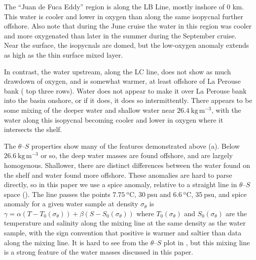 \documentclass[draft]{agujournal2019}
\begin{document}
The ``Juan de Fuca Eddy'' region is along the LB Line, mostly inshore of 0 km. This water is cooler and lower in oxygen than along the same isopycnal further offshore.  Also note that during the June cruise the water in this region was cooler and more oxygenated than later in the summer during the September cruise.  Near the surface, the isopycnals are domed, but the low-oxygen anomaly extends as high as the thin surface mixed layer.

In contrast, the water upstream, along the LC line, does not show as much drawdown of oxygen, and is somewhat warmer, at least offshore of La Perouse bank ( top three rows).  Water does not appear to make it over La Perouse bank into the basin onshore, or if it does, it does so intermittently.  There appears to be some mixing of the deeper water and shallow water near $26.4\ \mathrm{kg\,m^{-3}}$, with the water along this isopycnal becoming cooler and lower in oxygen where it intersects the shelf.

The $\theta$--$S$ properties show many of the features demonstrated above (a).  Below $26.6\ \mathrm{kg\,m^{-3}}$ or so, the deep water masses are found offshore, and are largely homogenous. Shallower, there are distinct differences between the water found on the shelf and water found more offshore.  These anomalies are hard to parse directly, so in this paper we use a spice anomaly, relative to a straight line in $\theta$--$S$ space (). The line passes the points $7.75\ \mathrm{^oC}$, $30\ \mathrm{psu}$ and $6.6\ \mathrm{^oC}$, $35\ \mathrm{psu}$, and spice anomaly for a given water sample at density $\sigma_{\theta}$ is $\gamma = \alpha \left(T - T_0\left(\sigma_{\theta}\right)\right) + \beta \left(S - S_0\left(\sigma_{\theta}\right)\right)$ where $T_0\left(\sigma_{\theta}\right)$ and $S_0\left(\sigma_{\theta}\right)$ are the temperature and salinity along the mixing line at the same density as the water sample, with the sign convention that positive is warmer and saltier than data along the mixing line.  It is hard to see from the $\theta$--$S$ plot in , but this mixing line is a strong feature of the water masses discussed in this paper.
\end{document}
